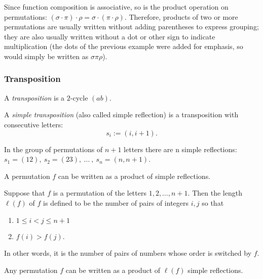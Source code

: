 Since function composition is associative, so is the product operation on permutations:
$\displaystyle (\sigma \cdot \pi )\cdot \rho =\sigma \cdot (\pi \cdot \rho )$. Therefore, products of two or
more permutations are usually written without adding parentheses to express grouping; they are also usually
written without a dot or other sign to indicate multiplication (the dots of the previous example were added for
emphasis, so would simply be written as $\displaystyle \sigma \pi \rho $).

\subsubsection{Transposition}
\begin{definition}[Transposition]
    A \textit{transposition} is a $2$-cycle $(ab)$.
\end{definition}
\begin{definition}
    A \textit{simple transposition} (also called simple reflection) is a transposition with consecutive letters:
    $$s_i:=(i,i+1).$$
\end{definition}
In the group of permutations of $n+1$ letters there are n simple reflections:
$s_1=(12),\ s_2=(23),\ \dots\ ,\ s_n=(n,n+1)$.

\begin{theorem}
    A permutation $f$ can be written as a product of simple reflections.
\end{theorem}

\begin{definition}
    Suppose that $f$ is a permutation of the letters $1, 2, \dots , n+1$. Then the length $\ell(f)$ of $f$
    is defined to be the number of pairs of integers $i, j$ so that
    \begin{enumerate}
        \item $1\leq i<j\leq n+1$
        \item $f(i) > f(j)$.
    \end{enumerate}
    In other words, it is the number of pairs of numbers whose order is switched by $f$.
\end{definition}

\begin{corollary}
    Any permutation $f$ can be written as a product of $\ell(f)$ simple reflections.
\end{corollary}

